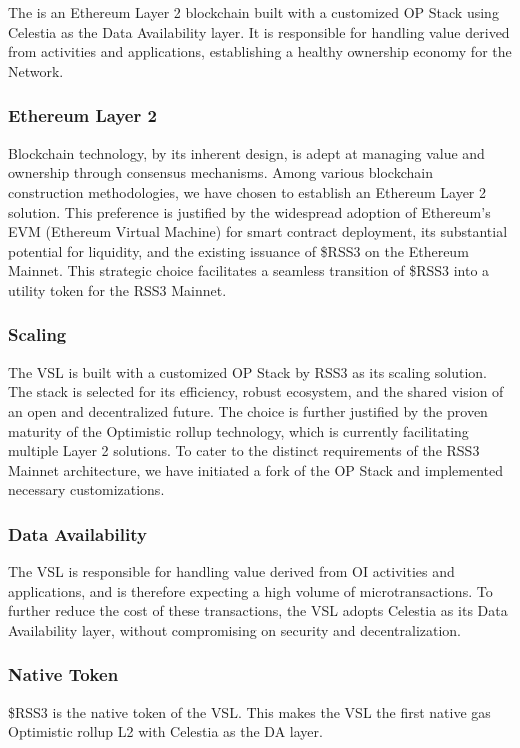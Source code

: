 \section{}
\label{sec:VSL}

The  is an Ethereum Layer 2 blockchain built with a customized OP Stack using Celestia as the Data Availability layer.
It is responsible for handling value derived from  activities and applications, establishing a healthy ownership economy for the Network.

\subsubsection{Ethereum Layer 2}

Blockchain technology, by its inherent design, is adept at managing value and ownership through consensus mechanisms.
Among various blockchain construction methodologies, we have chosen to establish an Ethereum Layer 2 solution.
This preference is justified by the widespread adoption of Ethereum's EVM (Ethereum Virtual Machine) for smart contract deployment, its substantial potential for liquidity, and the existing issuance of \$RSS3 on the Ethereum Mainnet. 
This strategic choice facilitates a seamless transition of \$RSS3 into a utility token for the RSS3 Mainnet.

\subsubsection{Scaling}
The \gls{VSL} is built with a customized OP Stack by RSS3 as its scaling solution.
The stack is selected for its efficiency, robust ecosystem, and the shared vision of an open and decentralized future.
The choice is further justified by the proven maturity of the Optimistic rollup technology, which is currently facilitating multiple Layer 2 solutions.
To cater to the distinct requirements of the RSS3 Mainnet architecture, we have initiated a fork of the OP Stack and implemented necessary customizations.

\subsubsection{Data Availability}

The \gls{VSL} is responsible for handling value derived from \gls{OI} activities and applications, and is therefore expecting a high volume of microtransactions.
To further reduce the cost of these transactions, the \gls{VSL} adopts Celestia as its Data Availability layer, without compromising on security and decentralization.

\subsubsection{Native Token}

\$RSS3 is the native token of the \gls{VSL}.
This makes the \gls{VSL} the first native gas Optimistic rollup L2 with Celestia as the DA layer.